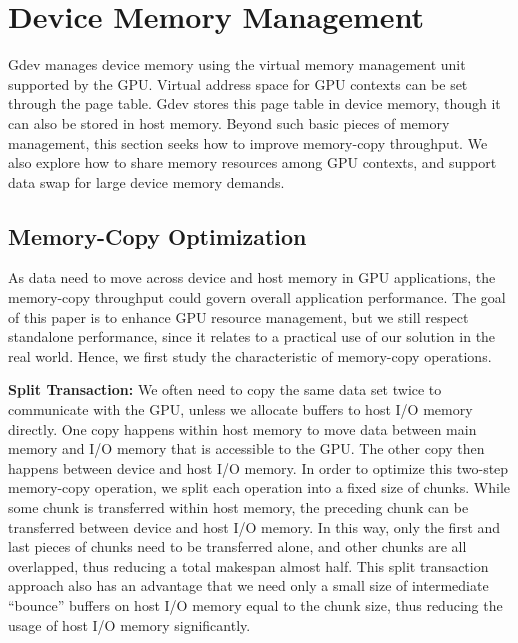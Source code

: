 \vspace{-0.25em}
\section{Device Memory Management}
\label{sec:memory_management}
\vspace{-0.25em}

Gdev manages device memory using the virtual memory management unit
supported by the GPU.
Virtual address space for GPU contexts can be set through the page
table.
Gdev stores this page table in device memory, though it can also be
stored in host memory.
Beyond such basic pieces of memory management, this section seeks how to
improve memory-copy throughput.
We also explore how to share memory resources among GPU contexts, and
support data swap for large device memory demands.

\vspace{-0.25em}
\subsection{Memory-Copy Optimization}
\label{sec:memory_copy}
\vspace{-0.25em}

As data need to move across device and host memory in GPU applications, 
the memory-copy throughput could govern overall application performance.
The goal of this paper is to enhance GPU resource management, but
we still respect standalone performance, since it relates to a practical
use of our solution in the real world.
Hence, we first study the characteristic of memory-copy operations.

\textbf{Split Transaction:}
We often need to copy the same data set twice to communicate with the
GPU, unless we allocate buffers to host I/O memory directly.
One copy happens within host memory to move data between main memory
and I/O memory that is accessible to the GPU.
The other copy then happens between device and host I/O memory.
In order to optimize this two-step memory-copy operation, we split each
operation into a fixed size of chunks.
While some chunk is transferred within host memory, the preceding chunk
can be transferred between device and host I/O memory.
In this way, only the first and last pieces of chunks need to be
transferred alone, and other chunks are all overlapped, thus reducing a
total makespan almost half.
This split transaction approach also has an advantage that we need only
a small size of intermediate ``bounce'' buffers on host I/O memory equal
to the chunk size, thus reducing the usage of host I/O memory
significantly.

